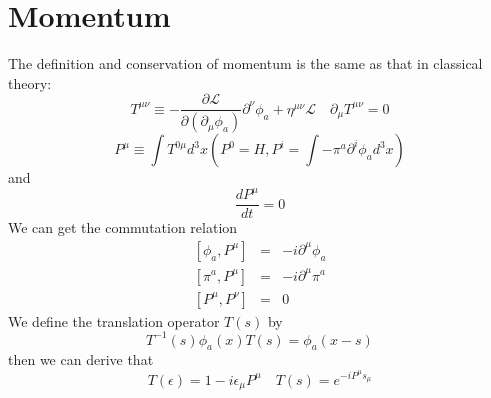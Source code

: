 \section{Momentum}
\noindent
The definition and conservation of momentum is the same as that in classical theory:
\[T^{\mu \nu} \equiv -\frac{\partial \mathcal{L}}{\partial(\partial_{\mu}\phi_a)} \partial^{\nu} \phi_a + \eta^{\mu \nu} \mathcal{L} \quad \partial_{\mu} T^{\mu \nu} = 0\]
\[P^{\mu} \equiv \int T^{0 \mu} d^3 x \left(P^{0} = H, P^{i} = \int -\pi^a \partial^i \phi_a d^3 x \right)\]
and
\[\frac{d P^{\mu}}{dt} = 0\]
We can get the commutation relation
\begin{eqnarray}
\left[\phi_a,P^{\mu}\right] &=& -i\partial^{\mu} \phi_a \nonumber \\
\left[\pi^a,P^{\mu}\right] &=& -i\partial^{\mu} \pi^a \nonumber \\
\left[P^{\mu},P^{\nu}\right] &=& 0 \nonumber 
\end{eqnarray}
We define the translation operator $T(s)$ by
\[T^{-1}(s) \phi_a(x) T(s) = \phi_a(x-s)\]
then we can derive that
\[T(\epsilon) = 1 - i\epsilon_{\mu} P^{\mu} \quad T(s) = e^{-iP^{\mu}s_{\mu}}\]


